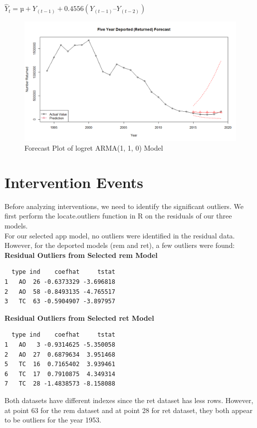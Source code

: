 \documentclass[a4paper]{article}
\begin{document}
$\hat{Y}_t = µ + Y_(t-1) +  0.4556 ( Y_(t-1) – Y_(t-2))$

\begin{figure}[h!]
\centering
\includegraphics[scale=0.3]{images/numret_forecast.png}
\caption{Forecast Plot of logret ARMA(1, 1, 0) Model}
\label{fig:forecast numret}
\end{figure}


\section{Intervention Events}
Before analyzing interventions, we need to identify the significant outliers. We first perform the locate.outliers function in R on the residuals of our three models. \\

For our selected app model, no outliers were identified in the residual data. However, for the deported models (rem and ret), a few outliers were found: \\

\textbf{Residual Outliers from Selected rem Model}
\begin{verbatim}
  type ind    coefhat     tstat
1   AO  26 -0.6373329 -3.696818
2   AO  58 -0.8493135 -4.765517
3   TC  63 -0.5904907 -3.897957
\end{verbatim}

\textbf{Residual Outliers from Selected ret Model}
\begin{verbatim}
  type ind    coefhat     tstat
1   AO   3 -0.9314625 -5.350058
2   AO  27  0.6879634  3.951468
5   TC  16  0.7165402  3.939461
6   TC  17  0.7910875  4.349314
7   TC  28 -1.4838573 -8.158088
\end{verbatim}

Both datasets have different indexes since the ret dataset has less rows. However, at point 63 for the rem dataset and at point 28 for ret dataset, they both appear to be outliers for the year 1953.
\end{document}

